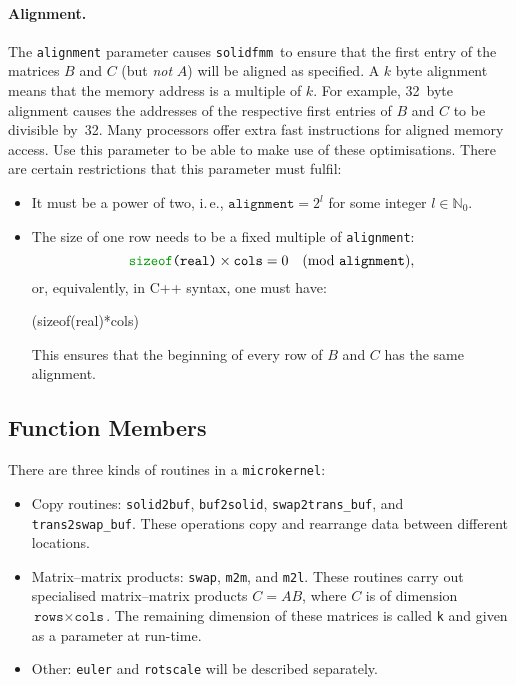 \documentclass{scrbook}
\newcommand{\colour}{\color}
\newcommand{\solidfmm}{\texttt{solidfmm}}
\newcommand{\naturals}{\ensuremath{\mathbb{N}}}
\begin{document}
\paragraph{Alignment.}
The \lstinline|alignment| parameter causes \solidfmm\ to ensure that
the first entry of the matrices $B$ and $C$ (but \emph{not} $A$) will be aligned
as specified. A $k$ byte alignment means that the memory address is a multiple
of $k$. For example, 32~byte alignment causes the addresses of the respective
first entries of $B$ and $C$ to be divisible by~32. Many processors offer extra
fast instructions for aligned memory access. Use this parameter to be able to
make use of these optimisations. There are certain restrictions that this
parameter must fulfil:
\begin{itemize}
\item It must be a power of two, i.\,e., $\texttt{alignment}=2^l$ for some
integer $l\in\naturals_0$.
\item The size of one row needs to be a fixed multiple of \lstinline|alignment|:
\begin{equation*}
\texttt{{\colour{green!60!black}sizeof}(real)}\times\texttt{cols} = 0 \quad
(\mathrm{mod}\ \texttt{alignment}),
\end{equation*}
or, equivalently, in C++ syntax, one must have:
\begin{cppcode*}
(sizeof(real)*cols) %
\end{cppcode*}
This ensures that the beginning of every row of $B$ and $C$ has the same
alignment.
\end{itemize}

\subsection{Function Members}
There are three kinds of routines in a \lstinline|microkernel|:
\begin{itemize}
\item Copy routines: \lstinline|solid2buf|, \lstinline|buf2solid|,
\lstinline|swap2trans_buf|, and \lstinline|trans2swap_buf|. These
operations copy and rearrange data between different locations.
\item Matrix--matrix products: \lstinline|swap|, \lstinline|m2m|, and
\lstinline|m2l|. These routines carry out specialised matrix--matrix
products $C=AB$, where $C$ is of dimension $\texttt{rows}\times
\texttt{cols}$. The remaining dimension of these matrices is
called \lstinline|k| and given as a parameter at run-time.
\item Other: \lstinline|euler| and \lstinline|rotscale| will be
described separately.
\end{itemize}
\end{document}
